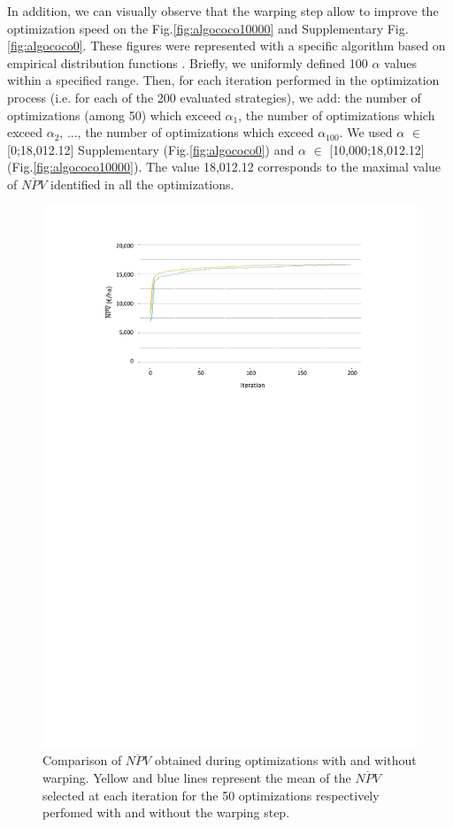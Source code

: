 In addition, we can visually observe that the warping step allow to improve the optimization speed on the Fig.\ref{fig:algococo10000} and Supplementary Fig.\ref{fig:algococo0}.
These figures were represented with a specific algorithm based on empirical distribution functions \cite{hansen2010}. Briefly, we uniformly defined 100 $\alpha$ values within a specified range. 
Then, for each iteration performed in the optimization process (i.e. for each of the 200 evaluated strategies), we add: 
the number of optimizations (among 50) which exceed $\alpha_1$, the number of optimizations which exceed $\alpha_2$, ..., 
the number of optimizations which exceed $\alpha_{100}$. We used $\alpha$ $\in$ [0;18,012.12] Supplementary (Fig.\ref{fig:algococo0}) and $\alpha$ $\in$ [10,000;18,012.12] (Fig.\ref{fig:algococo10000}). The value 18,012.12 corresponds to the maximal value of $\overline{NPV}$ identified in all the optimizations.



\begin{figure}[!ht]
	\centering
	\includegraphics[trim = 3.1cm 18.1cm 2.7cm 1.9cm, clip, width=\textwidth]{Figures_Warping_resultats_courbes_moyennes_mean_NPV_warping_sanswarping.pdf}
	\caption{Comparison of $\overline{NPV}$ obtained during optimizations with and without warping. 
		Yellow and blue lines represent the mean of the $\overline{NPV}$ selected at each iteration for the 50 optimizations respectively perfomed with and without the warping step. }\label{fig:moyennesNPV}
\end{figure}

